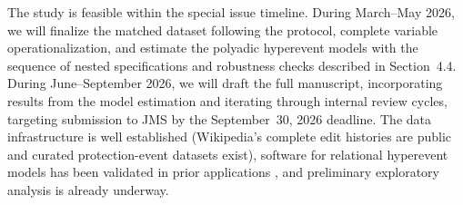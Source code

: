 \documentclass[11pt]{article}
\begin{document}
The study is feasible within the special issue timeline. During March--May 2026, we will finalize the matched dataset following the \citet{Ruprechter2025} protocol, complete variable operationalization, and estimate the polyadic hyperevent models with the sequence of nested specifications and robustness checks described in Section~4.4. During June--September 2026, we will draft the full manuscript, incorporating results from the model estimation and iterating through internal review cycles, targeting submission to JMS by the September~30, 2026 deadline. The data infrastructure is well established (Wikipedia's complete edit histories are public and curated protection-event datasets exist), software for relational hyperevent models has been validated in prior applications \citep{Lerner2023, Bianchi2024}, and preliminary exploratory analysis is already underway.


\clearpage
\end{document}

